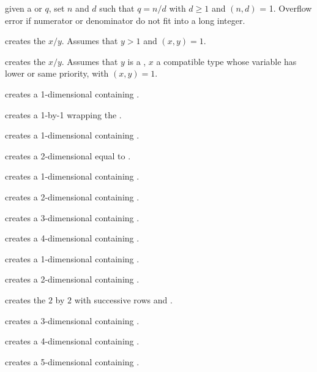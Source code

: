  given a  or  $q$,
set $n$ and $d$ such that $q = n/d$ with $d \geq 1$ and $(n,d)$ = 1. Overflow
error if numerator or denominator do not fit into a long integer.

 creates the  $x/y$. Assumes that
$y > 1$ and $(x,y) = 1$.

 creates the  $x/y$.
Assumes that $y$ is a , $x$ a compatible type whose variable has
lower or same priority, with $(x,y) = 1$.

 creates a 1-dimensional  containing
.

 creates a 1-by-1  wrapping the 
.

 creates a 1-dimensional  containing
.

 creates a 2-dimensional  equal
to \kbd{[x,y]}.

 creates a 1-dimensional 
containing .

 creates a 2-dimensional 
containing .

 creates a 3-dimensional 
containing .

 creates a 4-dimensional
 containing .

 creates a 1-dimensional 
containing .

 creates a 2-dimensional 
containing .

 creates the $2$ by $2$
 with successive rows  and
.

 creates a 3-dimensional 
containing .

 creates a 4-dimensional
 containing .

 creates a 5-dimensional
 containing .

